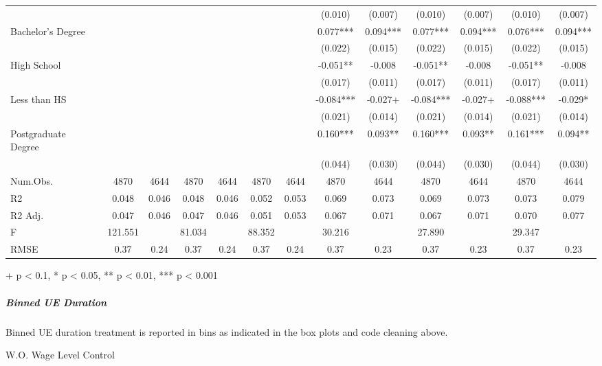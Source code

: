 \documentclass[
]{article}
\begin{document}
\begin{table}[t]
\begin{tabular*}{\linewidth}{@{\extracolsep{\fill}}lcccccccccccc}
 &  &  &  &  &  &  & (0.010) & (0.007) & (0.010) & (0.007) & (0.010) & (0.007) \\ 
Bachelor's Degree &  &  &  &  &  &  & 0.077*** & 0.094*** & 0.077*** & 0.094*** & 0.076*** & 0.094*** \\ 
 &  &  &  &  &  &  & (0.022) & (0.015) & (0.022) & (0.015) & (0.022) & (0.015) \\ 
High School &  &  &  &  &  &  & -0.051** & -0.008 & -0.051** & -0.008 & -0.051** & -0.008 \\ 
 &  &  &  &  &  &  & (0.017) & (0.011) & (0.017) & (0.011) & (0.017) & (0.011) \\ 
Less than HS &  &  &  &  &  &  & -0.084*** & -0.027+ & -0.084*** & -0.027+ & -0.088*** & -0.029* \\ 
 &  &  &  &  &  &  & (0.021) & (0.014) & (0.021) & (0.014) & (0.021) & (0.014) \\ 
Postgraduate Degree &  &  &  &  &  &  & 0.160*** & 0.093** & 0.160*** & 0.093** & 0.161*** & 0.094** \\ 
{} & {} & {} & {} & {} & {} & {} & {(0.044)} & {(0.030)} & {(0.044)} & {(0.030)} & {(0.044)} & {(0.030)} \\ 
Num.Obs. & 4870 & 4644 & 4870 & 4644 & 4870 & 4644 & 4870 & 4644 & 4870 & 4644 & 4870 & 4644 \\ 
R2 & 0.048 & 0.046 & 0.048 & 0.046 & 0.052 & 0.053 & 0.069 & 0.073 & 0.069 & 0.073 & 0.073 & 0.079 \\ 
R2 Adj. & 0.047 & 0.046 & 0.047 & 0.046 & 0.051 & 0.053 & 0.067 & 0.071 & 0.067 & 0.071 & 0.070 & 0.077 \\ 
F & 121.551 &  & 81.034 &  & 88.352 &  & 30.216 &  & 27.890 &  & 29.347 &  \\ 
RMSE & 0.37 & 0.24 & 0.37 & 0.24 & 0.37 & 0.24 & 0.37 & 0.23 & 0.37 & 0.23 & 0.37 & 0.23 \\ 
\bottomrule
\end{tabular*}
\begin{minipage}{\linewidth}
+ p < 0.1, * p < 0.05, ** p < 0.01, *** p < 0.001\\
\end{minipage}
\end{table}

\subparagraph{Binned UE Duration}\label{binned-ue-duration}

Binned UE duration treatment is reported in bins as indicated in the box
plots and code cleaning above.

W.O. Wage Level Control
\end{document}
